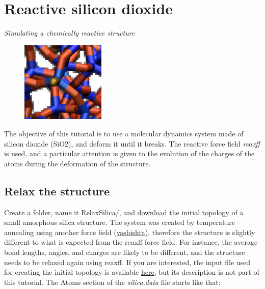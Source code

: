 \chapter{Reactive silicon dioxide}
\label{reactive-silicon-dioxide-label}

\vspace{-1cm} \noindent \textcolor{graytitle}{\textit{{\Large Simulating a chemically reactive structure}}\vspace{0.5cm} }

\noindent \hspace{-0.45cm}\begin{figure}
\includegraphics[width=4cm]{tutorials/level3/reactive-silicon-dioxide/SiO_gif_light.png}
\end{figure}

\noindent The objective of this tutorial is to use a molecular
dynamics system made of silicon dioxide (SiO2), and deform 
it until it breaks. The reactive force field \textit{reaxff} is used, and 
a particular attention is given to the evolution of the charges
of the atoms during the deformation of the structure. 

\section{Relax the structure}

\noindent Create a folder, name it RelaxSilica/, and \href{../../../../../inputs/level3/reactive-silicon-dioxide/RelaxSilica/silica.data}{download}
the initial topology of a small amorphous silica structure.
The system was created by temperature annealing using another force field 
(\href{../../../../../inputs/level3/reactive-silicon-dioxide/CreateSilica/SiO.1990.vashishta}{vashishta}), therefore the structure is slightly
different to what is expected from the reaxff force field. 
For instance, the average bond lengths, angles, and charges 
are likely to be different, and the structure needs 
to be relaxed again using reaxff. 
If you are interested, the input file used for creating the initial topology is 
available \href{../../../../../inputs/level3/reactive-silicon-dioxide/CreateSilica/input.lammps}{here}, but its description is not part of this tutorial.
The Atoms section of the \textit{silica.data} file starts like that:

